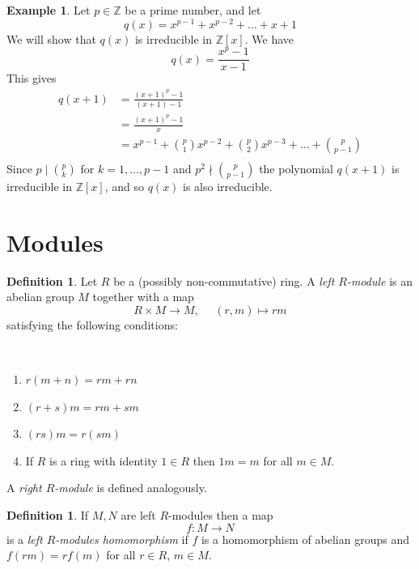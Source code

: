 \documentclass[12pt, letterpaper, oneside]{article}
\theoremstyle{plain}
\theoremstyle{definition}
\newtheorem{definition}[theorem]{Definition}
\newtheorem{example}[theorem]{Example}
\newcommand{\lra}{\longrightarrow}
\newcommand{\Z}{{\mathbb Z}}
\newcommand{\benu}{\begin{enumerate}}
\newcommand{\eenu}{\end{enumerate}}
\newcommand{\vs}{\vskip 5mm}
\newcommand{\isep}[1][0]{\setlength{\itemsep}{#1 mm}}
\begin{document}
\vs\vs
 
 \begin{example}
 Let $p\in \Z$ be a prime number, and let 
 $$q(x) = x^{p-1} + x^{p-2} + {\dots} + x +1$$
 We will show that $q(x)$ is irreducible in $\Z[x]$. 
 We have 
$$q(x) = \frac{x^{p} -1}{x-1}$$
This gives 
\begin{align*}
q(x+1) & = \frac{(x+1)^{p} -1}{(x+1) -1}  \\
& = \frac{(x+1)^{p}-1}{x}  \\
 &=  x^{p-1} + \binom{p}{1}x^{p-2} + \binom{p}{2}x^{p-3} + {\dots} + \binom{p}{p-1} \\
\end{align*}
Since $p\mid \binom{p}{k}$ for $k=1, \dots,  p-1$ and $p^{2}\nmid \binom{p}{p-1}$ the polynomial 
$q(x+1)$ is irreducible in $\Z[x]$, and so $q(x)$ is also irreducible. 
  \end{example}
 
 




 




\newpage
\section{Modules}
\label{SEC_MODULES}

\begin{definition}
Let $R$ be a (possibly non-commutative) ring. A \emph{left $R$-module} is an abelian group 
$M$ together with a map 
$$R\times M \to M, \ \ \ \ \ \ (r, m) \mapsto rm$$
satisfying the following conditions:

\vskip -13mm

\ 
\benu
\isep[0]
\item $r(m+n) = rm + rn$
\item $(r+s)m = rm + sm$
\item $(rs)m = r(sm)$ 
\item If $R$ is a ring with identity $1\in R$ then $1m = m$ for all $m\in M$.
\eenu




A \emph{right $R$-module} is defined analogously. 
\end{definition} 
 
 
\vs\vs

\begin{definition}
If $M, N$ are left $R$-modules then a map 
$$f\colon M\lra N$$
is a \emph{left $R$-modules homomorphism}
if $f$ is a homomorphism of abelian groups and $f(rm) = rf(m)$
for all $r\in R$, $m\in M$.
\end{definition} 
 
\end{document}
